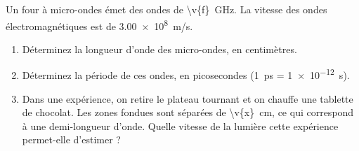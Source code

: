 Un four à micro-ondes émet des ondes de \qty{\v{f}}{GHz}. La vitesse des ondes électromagnétiques est de \qty{3.00e8}{m/s}.

\begin{enumerate}[label=\alph*)]
    \item Déterminez la longueur d'onde des micro-ondes, en centimètres.
    \item Déterminez la période de ces ondes, en picosecondes (\qty{1}{ps} = \qty{1e-12}{s}).
    \item Dans une expérience, on retire le plateau tournant et on chauffe une tablette de chocolat. Les zones fondues sont séparées de \qty{\v{x}}{cm}, ce qui correspond à une demi-longueur d'onde. Quelle vitesse de la lumière cette expérience permet-elle d'estimer ?
\end{enumerate}
